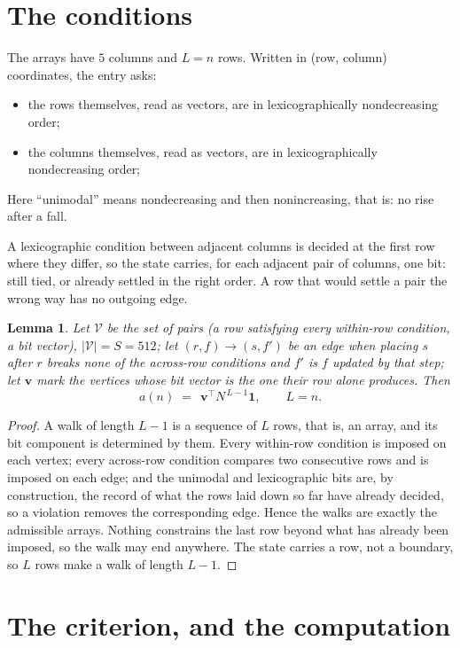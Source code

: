 \documentclass[11pt,a4paper]{article}
\theoremstyle{plain}
\newtheorem{lemma}[theorem]{Lemma}
\theoremstyle{definition}
\begin{document}
\section{The conditions}

The arrays have $5$ columns and $L=n$ rows. Written in (row, column)
coordinates, the entry asks:
\begin{itemize}
\item the rows themselves, read as vectors, are in lexicographically nondecreasing order;
\item the columns themselves, read as vectors, are in lexicographically nondecreasing order;
\end{itemize}
Here ``unimodal'' means nondecreasing and then nonincreasing, that is: no rise after a fall.

A lexicographic condition between adjacent columns is decided
at the first row where they differ, so the state carries, for each adjacent pair of
columns, one bit: still tied, or already settled in the right order. A row that would
settle a pair the wrong way has no outgoing edge.

\begin{lemma}\label{lem:walk}
Let $\mathcal V$ be the set of pairs (a row satisfying every within-row condition, a
bit vector), $|\mathcal V|=S=512$; let $(r,f)\to(s,f')$ be an edge when placing $s$ after $r$
breaks none of the across-row conditions and $f'$ is $f$ updated by that step; let
$\mathbf{v}$ mark the vertices whose bit vector is the one their row alone produces.
Then
\[
a(n)\;=\;\,\mathbf{v}^{\!\top}N^{\,L-1}\mathbf{1},\qquad L=n.
\]
\end{lemma}

\begin{proof}
A walk of length $L-1$ is a sequence of $L$ rows, that is, an array, and its bit component
is determined by them. Every within-row condition is imposed on each vertex; every
across-row condition compares two consecutive rows and is imposed on each edge; and the
unimodal and lexicographic bits are, by construction, the record of what the rows laid down
so far have already decided, so a violation removes the corresponding edge. Hence the walks
are exactly the admissible arrays. Nothing constrains the last row beyond what has already
been imposed, so the walk may end anywhere. The state carries a row, not a boundary, so
$L$ rows make a walk of length $L-1$.
\end{proof}

\section{The criterion, and the computation}
\end{document}
